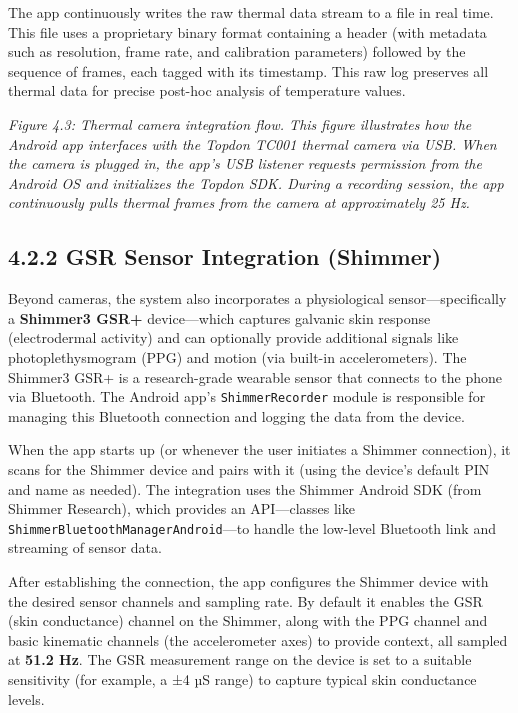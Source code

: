 The app continuously writes the raw thermal data stream to a file in real time. This file uses a proprietary binary format containing a header (with metadata such as resolution, frame rate, and calibration parameters) followed by the sequence of frames, each tagged with its timestamp. This raw log preserves all thermal data for precise post-hoc analysis of temperature values.

\textit{Figure 4.3: Thermal camera integration flow. This figure illustrates how the Android app interfaces with the Topdon TC001 thermal camera via USB. When the camera is plugged in, the app's USB listener requests permission from the Android OS and initializes the Topdon SDK. During a recording session, the app continuously pulls thermal frames from the camera at approximately 25 Hz.}

\subsection{4.2.2 GSR Sensor Integration (Shimmer)}

Beyond cameras, the system also incorporates a physiological sensor—specifically a \textbf{Shimmer3 GSR+} device—which captures galvanic skin response (electrodermal activity) and can optionally provide additional signals like photoplethysmogram (PPG) and motion (via built-in accelerometers). The Shimmer3 GSR+ is a research-grade wearable sensor that connects to the phone via Bluetooth. The Android app's \texttt{ShimmerRecorder} module is responsible for managing this Bluetooth connection and logging the data from the device.

When the app starts up (or whenever the user initiates a Shimmer connection), it scans for the Shimmer device and pairs with it (using the device's default PIN and name as needed). The integration uses the Shimmer Android SDK (from Shimmer Research), which provides an API—classes like \texttt{ShimmerBluetoothManagerAndroid}—to handle the low-level Bluetooth link and streaming of sensor data.

After establishing the connection, the app configures the Shimmer device with the desired sensor channels and sampling rate. By default it enables the GSR (skin conductance) channel on the Shimmer, along with the PPG channel and basic kinematic channels (the accelerometer axes) to provide context, all sampled at \textbf{51.2 Hz}. The GSR measurement range on the device is set to a suitable sensitivity (for example, a ±4 µS range) to capture typical skin conductance levels.

